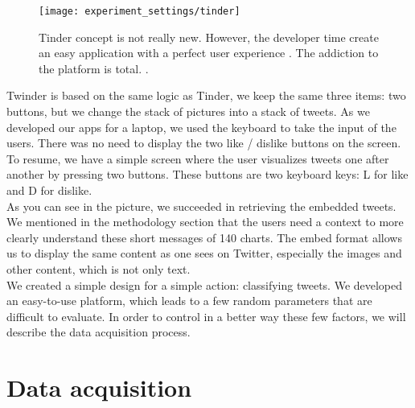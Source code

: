 \begin{figure}[h] 
\centering 
\texttt{[image: experiment\_settings/tinder]} 
\caption[Tinder design]{Tinder concept is not really new. However, the developer time create an easy application with a perfect user experience \cite{ti_design}. The addiction to the platform is total. \cite{ti_addiction}. } 
\label{fig:tinder} 
\end{figure}

Twinder is based on the same logic as Tinder, we keep the same three items: two buttons, but we change the stack of pictures into a stack of tweets. As we developed our apps for a laptop, we used the keyboard to take the input of the users. There was no need to display the two like / dislike buttons on the screen. To resume, we have a simple screen where the user visualizes tweets one after another by pressing two buttons. These buttons are two keyboard keys: L for like and D for dislike.\\
As you can see in the picture, we succeeded in retrieving the embedded tweets. We mentioned in the methodology section that the users need a context to more clearly understand these short messages of 140 charts. The embed format allows us to display the same content as one sees on Twitter, especially the images and other content, which is not only text.\\
We created a simple design for a simple action: classifying tweets. We developed an easy-to-use platform, which leads to a few random parameters that are difficult to evaluate. In order to control in a better way these few factors, we will describe the data acquisition process.

\section{Data acquisition}

